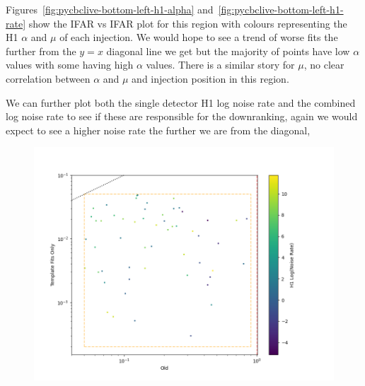%
Figures~\ref{fig:pycbclive-bottom-left-h1-alpha} and~\ref{fig:pycbclive-bottom-left-h1-rate} show the IFAR vs IFAR plot for this region with colours representing the H1 $\alpha$ and $\mu$ of each injection. We would hope to see a trend of worse fits the further from the $y=x$ diagonal line we get but the majority of points have low $\alpha$ values with some having high $\alpha$ values. There is a similar story for $\mu$, no clear correlation between $\alpha$ and $\mu$ and injection position in this region.

We can further plot both the single detector H1 log noise rate and the combined log noise rate to see if these are responsible for the downranking, again we would expect to see a higher noise rate the further we are from the diagonal,
%
\begin{figure}
  \centering
  \begin{minipage}[t]{1.0\linewidth}
  
    \includegraphics[width=1\textwidth]{images/pycbclive/bl_h1_lognoise.png}
    \caption{}
    \label{fig:pycbclive-bottom-left-h1-log-noise-rate}
  
  

\end{minipage}
\end{figure}
